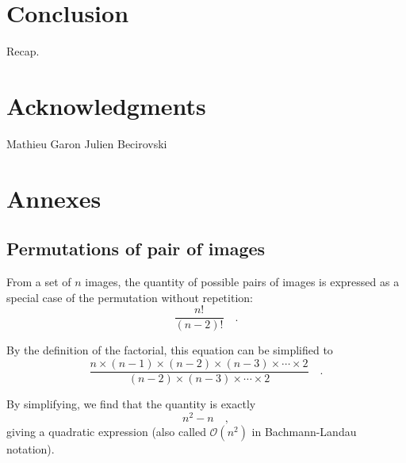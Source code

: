 \documentclass{report}
\begin{document}
\chapter{Conclusion}\label{conclusion}

Recap.

\chapter*{Acknowledgments}

Mathieu Garon
Julien Becirovski

\chapter*{Annexes}

\section{Permutations of pair of images}
\label{anx:permutations}

From a set of $n$ images, the quantity of possible pairs of images is expressed as a special case of the permutation without repetition:
\begin{equation}
\frac{n!}{\left( n - 2 \right)!} \quad.
\end{equation}

By the definition of the factorial, this equation can be simplified to
\begin{equation}
\frac{n \times (n-1) \times (n-2) \times (n-3) \times \cdots \times 2}{(n-2) \times (n-3) \times \cdots \times 2} \quad.
\end{equation}

By simplifying, we find that the quantity is exactly
\begin{equation}
n^2 - n\quad,
\end{equation}
giving a quadratic expression (also called $\mathcal{O}(n^2)$ in Bachmann-Landau notation).

{\small


}
\end{document}
